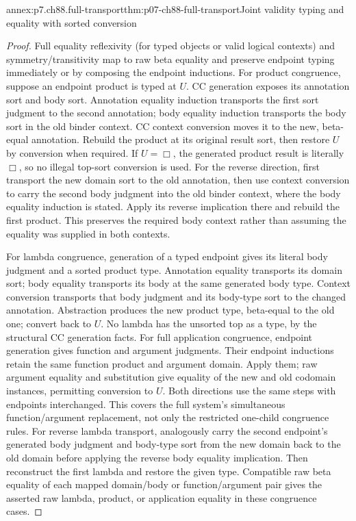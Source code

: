 \begin{annexitem}{annex:p7.ch88.full-transport}{thm:p07-ch88-full-transport}{Joint validity typing and equality with sorted conversion}
\begin{proof}
Full equality reflexivity (for typed objects or valid logical contexts)
and symmetry/transitivity map to raw beta equality and preserve endpoint
typing immediately or by composing the endpoint inductions. For product
congruence, suppose an endpoint product is typed at \(U\). CC generation
exposes its annotation sort and body sort. Annotation equality induction
transports the first sort judgment to the second annotation; body
equality induction transports the body sort in the old binder context.
CC context conversion moves it to the new, beta-equal annotation.
Rebuild the product at its original result sort, then restore \(U\)
by conversion when required. If \(U=\Box\), the generated product
result is literally \(\Box\), so no illegal top-sort conversion is
used. For the reverse direction, first transport the new domain sort
to the old annotation, then use context conversion to carry the
second body judgment into the old binder context, where the body
equality induction is stated. Apply its reverse implication there
and rebuild the first product. This preserves the required body
context rather than assuming the equality was supplied in both contexts.

For lambda congruence, generation of a typed endpoint gives its literal
body judgment and a sorted product type. Annotation equality transports
its domain sort; body equality transports its body at the same generated
body type. Context conversion transports that body judgment and its
body-type sort to the changed annotation. Abstraction produces the new
product type, beta-equal to the old one; convert back to \(U\).
No lambda has the unsorted top as a type, by the structural CC generation facts. For full application
congruence, endpoint generation gives function and argument judgments.
Their endpoint inductions retain the same function product and argument
domain. Apply them; raw argument equality and substitution give equality
of the new and old codomain instances, permitting conversion to \(U\).
Both directions use the same steps with endpoints interchanged.
This covers the full system's simultaneous function/argument replacement,
not only the restricted one-child congruence rules.
For reverse lambda transport, analogously carry the second endpoint's
generated body judgment and body-type sort from the new domain back to
the old domain before applying the reverse body equality implication.
Then reconstruct the first lambda and restore the given type. Compatible
raw beta equality of each mapped domain/body or function/argument pair
gives the asserted raw lambda, product, or application equality in
these congruence cases.


\end{proof}
\end{annexitem}
